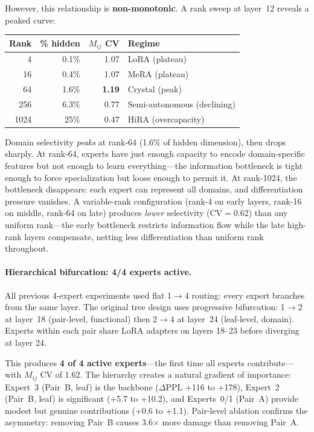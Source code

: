\documentclass{article}
\begin{document}
However, this relationship is \textbf{non-monotonic}. A rank sweep at
layer~12 reveals a peaked curve:

\begin{center}
\begin{tabular}{@{}rrrl@{}}
\toprule
Rank & \% hidden & $M_{ij}$ CV & Regime \\
\midrule
4 & 0.1\% & 1.07 & LoRA (plateau) \\
16 & 0.4\% & 1.07 & MeRA (plateau) \\
64 & 1.6\% & \textbf{1.19} & Crystal (peak) \\
256 & 6.3\% & 0.77 & Semi-autonomous (declining) \\
1024 & 25\% & 0.47 & HiRA (overcapacity) \\
\bottomrule
\end{tabular}
\end{center}

Domain selectivity \emph{peaks} at rank-64 (1.6\% of hidden dimension),
then drops sharply. At rank-64, experts have just enough capacity to encode
domain-specific features but not enough to learn everything---the
information bottleneck is tight enough to force specialization but loose
enough to permit it. At rank-1024, the bottleneck disappears: each expert
can represent all domains, and differentiation pressure vanishes. A
variable-rank configuration (rank-4 on early layers, rank-16 on middle,
rank-64 on late) produces \emph{lower} selectivity (CV$=$0.62) than any
uniform rank---the early bottleneck restricts information flow while the
late high-rank layers compensate, netting less differentiation than
uniform rank throughout.

\paragraph{Hierarchical bifurcation: 4/4 experts active.}
All previous 4-expert experiments used flat 1$\to$4 routing: every expert
branches from the same layer. The original tree design uses progressive
bifurcation: 1$\to$2 at layer~18 (pair-level, functional) then 2$\to$4 at
layer~24 (leaf-level, domain). Experts within each pair share LoRA adapters
on layers 18--23 before diverging at layer 24.

This produces \textbf{4 of 4 active experts}---the first time all experts
contribute---with $M_{ij}$ CV of 1.62. The hierarchy creates a natural
gradient of importance: Expert~3 (Pair~B, leaf) is the backbone
($\Delta$PPL +116 to +178), Expert~2 (Pair~B, leaf) is significant (+5.7
to +10.2), and Experts~0/1 (Pair~A) provide modest but genuine
contributions (+0.6 to +1.1). Pair-level ablation confirms the asymmetry:
removing Pair~B causes 3.6$\times$ more damage than removing Pair~A.
\end{document}
